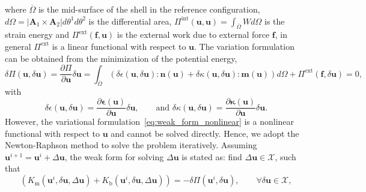 where $\overline{\Omega}$ is the mid-surface of the shell in the reference configuration, $d\Omega=\vert{\mathbf{A}_1\times\mathbf{A}_2}\vert d\theta^1 d\theta^2$ is the differential area, $\Pi^\text{int}(\mathbf{u},\mathbf{u}) = \int_{\overline{\Omega}}W d\Omega$ is the strain energy and $\Pi^\text{ext}(\mathbf{f},\mathbf{u})$ is the external work due to external force $\mathbf{f}$, in general $\Pi^\text{ext}$ is a linear functional with respect to $\mathbf{u}$. The variation formulation can be obtained from the minimization of the potential energy,
\begin{equation}
	\label{eq:weak_form_nonlinear}
	\delta \Pi(\mathbf{u},\delta\mathbf{u}) = \frac{\partial \Pi}{\partial \mathbf{u}} \delta\mathbf{u} = \int_{\overline{\Omega}} \left(\delta{\epsilon(\mathbf{u},\delta\mathbf{u})} \colon\mathbf{n}(\mathbf{u}) + \delta{\kappa(\mathbf{u},\delta\mathbf{u})} \colon \mathbf{m}(\mathbf{u}) \right)d \Omega+\Pi^\text{ext}(\mathbf{f},\delta\mathbf{u})= 0,
\end{equation}
with
\begin{equation}
	\label{}
	\delta{\epsilon(\mathbf{u},\delta\mathbf{u})} = \frac{\partial \mathbf{\epsilon}(\mathbf{u})}{\partial \mathbf{u}}\delta\mathbf{u},\qquad \text{and }\delta{\kappa(\mathbf{u},\delta\mathbf{u})} = \frac{\partial \mathbf{\kappa}(\mathbf{u})}{\partial \mathbf{u}}\delta\mathbf{u}.
\end{equation}
However, the variational formulation~\eqref{eq:weak_form_nonlinear} is a nonlinear functional with respect to $\mathbf{u}$ and cannot be solved directly. Hence, we adopt the Newton-Raphson method to solve the problem iteratively. Assuming $\mathbf{u}^{i+1} = \mathbf{u}^{i} +{\Delta} \mathbf{u}$, the weak form for solving ${\Delta} \mathbf{u}$ is stated as: find ${\Delta}\mathbf{u}\in \boldsymbol{\mathcal{X}}$, such that
\begin{equation}
	\label{eq:weak_form_linearized}
	\left(K_\text{m}(\mathbf{u}^i,\delta\mathbf{u},\Delta\mathbf{u})+K_\text{b}(\mathbf{u}^i,\delta\mathbf{u},\Delta\mathbf{u})\right)=-\delta \Pi(\mathbf{u}^{i},\delta\mathbf{u}),\qquad \forall \delta\mathbf{u}\in \boldsymbol{\mathcal{X}},
\end{equation}
